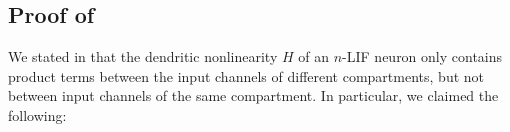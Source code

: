 
\pagebreak

\subsection{Proof of }
\label{app:nlif_product_terms}

We stated in  that the dendritic nonlinearity $H$ of an $n$-LIF neuron only contains product terms between the input channels of different compartments, but not between input channels of the same compartment.
In particular, we claimed the following:

\ThmNlifProductTerms*

